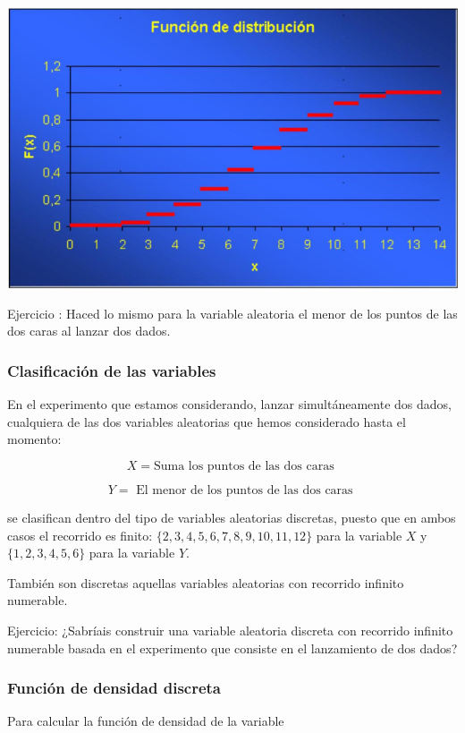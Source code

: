 \documentclass[
]{article}
\begin{document}
\includegraphics[width=0.9\linewidth]{images/clipboard-1894572766}

Ejercicio : Haced lo mismo para la variable aleatoria el menor de los
puntos de las dos caras al lanzar dos dados.

\subsubsection{Clasificación de las variables}\label{clasificaciuxf3n-de-las-variables}

En el experimento que estamos considerando, lanzar simultáneamente dos
dados, cualquiera de las dos variables aleatorias que hemos considerado
hasta el momento:

\[ X=\text {Suma los puntos de las dos caras } \]

\[
Y=\text { El menor de los puntos de las dos caras }
\]

se clasifican dentro del tipo de variables aleatorias discretas, puesto
que en ambos casos el recorrido es finito:
\(\{2,3,4,5,6,7,8,9,10,11, 12\}\) para la variable \(X\) y
\(\{1,2,3,4,5, 6\}\) para la variable \(Y\).

También son discretas aquellas variables aleatorias con recorrido
infinito numerable.

Ejercicio: ¿Sabríais construir una variable aleatoria discreta con
recorrido infinito numerable basada en el experimento que consiste en el
lanzamiento de dos dados?

\subsubsection{Función de densidad discreta}\label{funciuxf3n-de-densidad-discreta}

Para calcular la función de densidad de la variable
\end{document}
